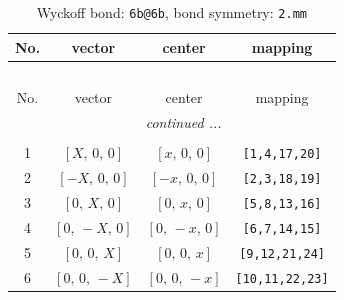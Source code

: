 \documentclass[fleqn,8pt]{jsarticle}
\begin{document}
\renewcommand{\arraystretch}{1.2}
\begin{longtable}{cccc}
\caption{Wyckoff bond: {\tt 6b@6b}, bond symmetry: {\tt 2.mm}}
 \\
 \hline \hline
No. & vector & center & mapping \\ \hline \endfirsthead

\multicolumn{3}{l}{\tablename\ \thetable{}} \\
 \hline \hline
No. & vector & center & mapping \\ \hline \endhead

 \hline \hline
\multicolumn{3}{r}{\footnotesize\it continued ...} \\ \endfoot

 \hline \hline
\multicolumn{3}{r}{} \\ \endlastfoot

1 & $\left[ X,\, 0,\, 0 \right]$ & $\left[ x,\, 0,\, 0 \right]$ & {\tt [1,4,17,20]} \\ \hline
2 & $\left[ - X,\, 0,\, 0 \right]$ & $\left[ - x,\, 0,\, 0 \right]$ & {\tt [2,3,18,19]} \\ \hline
3 & $\left[ 0,\, X,\, 0 \right]$ & $\left[ 0,\, x,\, 0 \right]$ & {\tt [5,8,13,16]} \\ \hline
4 & $\left[ 0,\, - X,\, 0 \right]$ & $\left[ 0,\, - x,\, 0 \right]$ & {\tt [6,7,14,15]} \\ \hline
5 & $\left[ 0,\, 0,\, X \right]$ & $\left[ 0,\, 0,\, x \right]$ & {\tt [9,12,21,24]} \\ \hline
6 & $\left[ 0,\, 0,\, - X \right]$ & $\left[ 0,\, 0,\, - x \right]$ & {\tt [10,11,22,23]} \\
\end{longtable}
\renewcommand{\arraystretch}{1.2}
\end{document}

